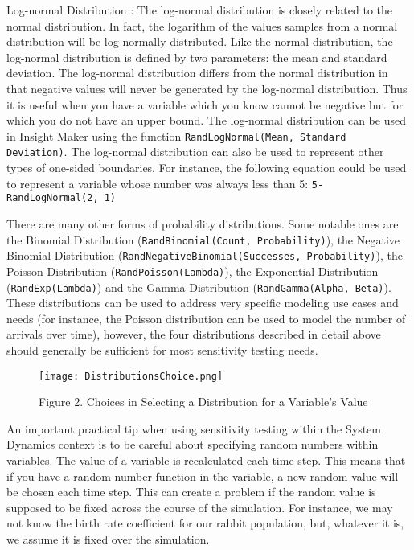 \documentclass[]{memoir}
\let\Oldincludegraphics\includegraphics
\renewcommand{\includegraphics}[1]{\Oldincludegraphics[max size={\textwidth}{\textheight}]{#1}}
\begin{document}
Log-normal Distribution : The log-normal distribution is closely related
to the normal distribution. In fact, the logarithm of the values samples
from a normal distribution will be log-normally distributed. Like the
normal distribution, the log-normal distribution is defined by two
parameters: the mean and standard deviation. The log-normal distribution
differs from the normal distribution in that negative values will never
be generated by the log-normal distribution. Thus it is useful when you
have a variable which you know cannot be negative but for which you do
not have an upper bound. The log-normal distribution can be used in
Insight Maker using the function
\lstinline!RandLogNormal(Mean, Standard Deviation)!. The log-normal
distribution can also be used to represent other types of one-sided
boundaries. For instance, the following equation could be used to
represent a variable whose number was always less than 5:
\lstinline!5-RandLogNormal(2, 1)!

There are many other forms of probability distributions. Some notable
ones are the Binomial Distribution
(\lstinline!RandBinomial(Count, Probability)!), the Negative Binomial
Distribution (\lstinline!RandNegativeBinomial(Successes, Probability)!),
the Poisson Distribution (\lstinline!RandPoisson(Lambda)!), the
Exponential Distribution (\lstinline!RandExp(Lambda)!) and the Gamma
Distribution (\lstinline!RandGamma(Alpha, Beta)!). These distributions
can be used to address very specific modeling use cases and needs (for
instance, the Poisson distribution can be used to model the number of
arrivals over time), however, the four distributions described in detail
above should generally be sufficient for most sensitivity testing needs.

\begin{figure}[htbp]
\centering
\texttt{[image: DistributionsChoice.png]}
\caption{Figure 2. Choices in Selecting a Distribution for a Variable's
Value}
\end{figure}

An important practical tip when using sensitivity testing within the
System Dynamics context is to be careful about specifying random numbers
within variables. The value of a variable is recalculated each time
step. This means that if you have a random number function in the
variable, a new random value will be chosen each time step. This can
create a problem if the random value is supposed to be fixed across the
course of the simulation. For instance, we may not know the birth rate
coefficient for our rabbit population, but, whatever it is, we assume it
is fixed over the simulation.
\end{document}
